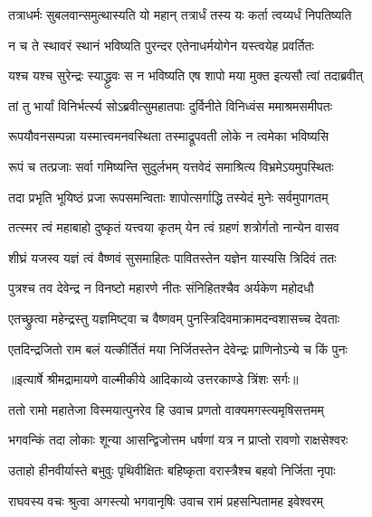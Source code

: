 \twolineshloka
{तत्राधर्मः सुबलवान्समुत्थास्यति यो महान्}
{तत्रार्धं तस्य यः कर्ता त्वय्यर्धं निपतिष्यति} %

\twolineshloka
{न च ते स्थावरं स्थानं भविष्यति पुरन्दर}
{एतेनाधर्मयोगेन यस्त्वयेह प्रवर्तितः} %

\twolineshloka
{यश्च यश्च सुरेन्द्रः स्याद्ध्रुवः स न भविष्यति}
{एष शापो मया मुक्त इत्यसौ त्वां तदाब्रवीत्} %

\twolineshloka
{तां तु भार्यां विनिर्भर्त्स्य सोऽब्रवीत्सुमहातपाः}
{दुर्विनीते विनिध्वंस ममाश्रमसमीपतः} %

\twolineshloka
{रूपयौवनसम्पन्ना यस्मात्त्वमनवस्थिता}
{तस्माद्रूपवती लोके न त्वमेका भविष्यसि} %

\twolineshloka
{रूपं च तत्प्रजाः सर्वा गमिष्यन्ति सुदुर्लभम्}
{यत्तवेदं समाश्रित्य विभ्रमेऽयमुपस्थितः} %

\twolineshloka
{तदा प्रभृति भूयिष्ठं प्रजा रूपसमन्विताः}
{शापोत्सर्गाद्धि तस्येदं मुनेः सर्वमुपागतम्} %

\twolineshloka
{तत्स्मर त्वं महाबाहो दुष्कृतं यत्त्वया कृतम्}
{येन त्वं ग्रहणं शत्रोर्गतो नान्येन वासव} %

\twolineshloka
{शीघ्रं यजस्व यज्ञं त्वं वैष्णवं सुसमाहितः}
{पावितस्तेन यज्ञेन यास्यसि त्रिदिवं ततः} %

\twolineshloka
{पुत्रश्च तव देवेन्द्र न विनष्टो महारणे}
{नीतः संनिहितश्चैव अर्यकेण महोदधौ} %

\twolineshloka
{एतच्छ्रुत्वा महेन्द्रस्तु यज्ञमिष्ट्वा च वैष्णवम्}
{पुनस्त्रिदिवमाक्रामदन्वशासच्च देवताः} %

\twolineshloka
{एतदिन्द्रजितो राम बलं यत्कीर्तितं मया}
{निर्जितस्तेन देवेन्द्रः प्राणिनोऽन्ये च किं पुनः} %


{॥इत्यार्षे श्रीमद्रामायणे वाल्मीकीये आदिकाव्ये उत्तरकाण्डे त्रिंशः सर्गः॥}


\twolineshloka
{ततो रामो महातेजा विस्मयात्पुनरेव हि}
{उवाच प्रणतो वाक्यमगस्त्यमृषिसत्तमम्} %

\twolineshloka
{भगवन्किं तदा लोकाः शून्या आसन्द्विजोत्तम}
{धर्षणां यत्र न प्राप्तो रावणो राक्षसेश्वरः} %

\twolineshloka
{उताहो हीनवीर्यास्ते बभुवुः पृथिवीक्षितः}
{बहिष्कृता वरास्त्रैश्च बहवो निर्जिता नृपाः} %

\twolineshloka
{राघवस्य वचः श्रुत्वा अगस्त्यो भगवानृषिः}
{उवाच रामं प्रहसन्पितामह इवेश्वरम्} %

